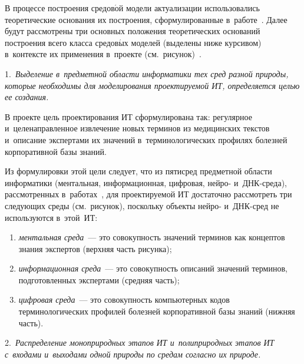 \begin{multicols}{2}
  В процессе построения средов$\acute{\mbox{о}}$й модели актуализации 
использовались теоретические основания их построения, сформулированные 
в~работе~\cite{14-zz}. Далее будут рассмотрены три основных положения 
теоретических оснований построения всего класса 
средов$\acute{\mbox{ы}}$х моделей (выделены ниже курсивом) в~контексте 
их применения в~проекте (см.\ рисунок)~\cite{10-zz, 15-zz}.
  
  \smallskip
  
  1.\ \textit{Выделение в~предметной области информатики тех сред разной 
природы, которые необходимы для моделирования проектируемой ИТ, 
определяется целью ее создания.}
  
  \smallskip
  
  В проекте цель проектирования ИТ сформулирована так: регулярное 
и~целенаправленное извлечение новых терминов из медицинских текстов 
и~описание экспертами их значений в~терминологических профилях 
болезней корпоративной базы знаний. 
  
  Из формулировки этой цели следует, что из пяти\linebreak сред предметной  
об\-ласти информатики (ментальная, информационная, цифровая, нейро-  
и~ДНК-сре\-да), рассмотренных в~работах~\cite{16-zz, 17-zz, 18-zz}, для 
проектируемой ИТ достаточно рассмотреть три \mbox{следующих} среды (см.\ 
рисунок), поскольку объекты нейро- и~ДНК-сред не используются в~этой~ИТ:
  \begin{enumerate}[(1)]
  \item \textit{ментальная среда}~--- это совокупность значений терминов 
как концептов знания экспертов (верхняя часть рисунка);
  \item \textit{информационная среда}~--- это совокупность описаний 
значений терминов, подготовленных экспертами (средняя часть);
  \item \textit{цифровая среда}~--- это совокупность компьютерных кодов 
терминологических профилей болезней корпоративной базы знаний (нижняя 
часть).
  \end{enumerate}
  
  2.\ \textit{Распределение моноприродных этапов ИТ и~полиприродных 
этапов ИТ с~входами и~выходами одной природы по средам согласно их 
природе.}
  
  \smallskip
  

\end{multicols}

